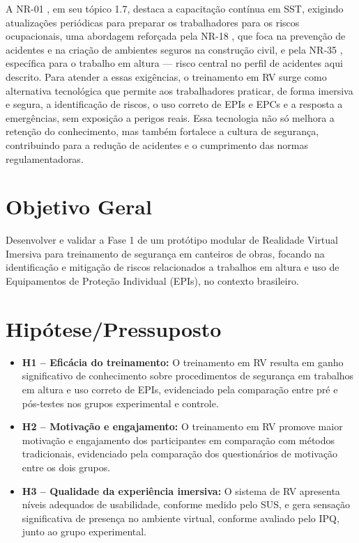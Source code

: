 A \gls{NR}-01 \cite{brasil2024nr01}, em seu tópico 1.7, destaca a capacitação contínua em \gls{SST}, exigindo atualizações periódicas para preparar os trabalhadores para os riscos ocupacionais, uma abordagem reforçada pela NR-18 \cite{brasil2025nr18}, que foca na prevenção de acidentes e na criação de ambientes seguros na construção civil, e pela NR-35 \cite{brasil2023nr35}, específica para o trabalho em altura — risco central no perfil de acidentes aqui descrito. Para atender a essas exigências, o treinamento em \gls{RV} surge como alternativa tecnológica que permite aos trabalhadores praticar, de forma imersiva e segura, a identificação de riscos, o uso correto de \glspl{EPI} e \glspl{EPC} e a resposta a emergências, sem exposição a perigos reais. Essa tecnologia não só melhora a retenção do conhecimento, mas também fortalece a cultura de segurança, contribuindo para a redução de acidentes e o cumprimento das normas regulamentadoras.

\section{Objetivo Geral}

Desenvolver e validar a Fase 1 de um protótipo modular de Realidade Virtual Imersiva para treinamento de segurança em canteiros de obras, focando na identificação e mitigação de riscos relacionados a trabalhos em altura e uso de Equipamentos de Proteção Individual (EPIs), no contexto brasileiro.

\section{Hipótese/Pressuposto}

\begin{itemize}
    \item \textbf{H1 -- Eficácia do treinamento:} O treinamento em RV resulta em ganho significativo de conhecimento sobre procedimentos de segurança em trabalhos em altura e uso correto de EPIs, evidenciado pela comparação entre pré e pós-testes nos grupos experimental e controle.

    \item \textbf{H2 -- Motivação e engajamento:} O treinamento em RV promove maior motivação e engajamento dos participantes em comparação com métodos tradicionais, evidenciado pela comparação dos questionários de motivação entre os dois grupos.

    \item \textbf{H3 -- Qualidade da experiência imersiva:} O sistema de RV apresenta níveis adequados de usabilidade, conforme medido pelo \gls{SUS}, e gera sensação significativa de presença no ambiente virtual, conforme avaliado pelo \gls{IPQ}, junto ao grupo experimental.
\end{itemize}
